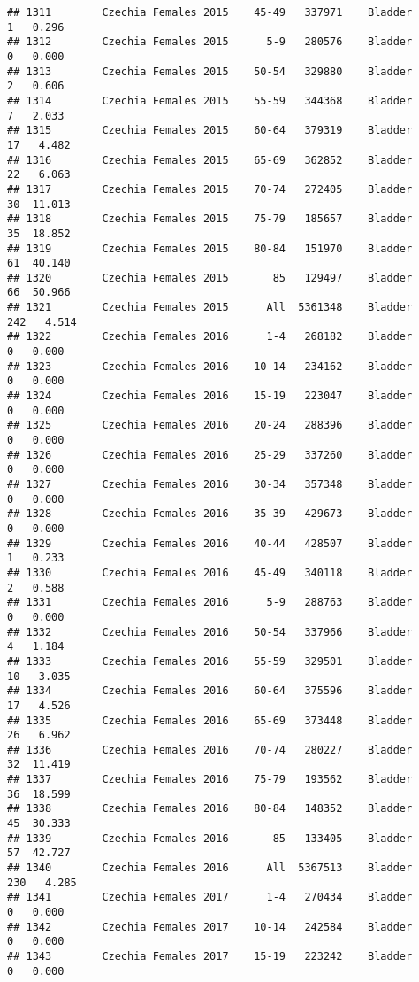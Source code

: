 \documentclass[
]{article}
\begin{document}
\begin{verbatim}
## 1311        Czechia Females 2015    45-49   337971    Bladder      1   0.296
## 1312        Czechia Females 2015      5-9   280576    Bladder      0   0.000
## 1313        Czechia Females 2015    50-54   329880    Bladder      2   0.606
## 1314        Czechia Females 2015    55-59   344368    Bladder      7   2.033
## 1315        Czechia Females 2015    60-64   379319    Bladder     17   4.482
## 1316        Czechia Females 2015    65-69   362852    Bladder     22   6.063
## 1317        Czechia Females 2015    70-74   272405    Bladder     30  11.013
## 1318        Czechia Females 2015    75-79   185657    Bladder     35  18.852
## 1319        Czechia Females 2015    80-84   151970    Bladder     61  40.140
## 1320        Czechia Females 2015       85   129497    Bladder     66  50.966
## 1321        Czechia Females 2015      All  5361348    Bladder    242   4.514
## 1322        Czechia Females 2016      1-4   268182    Bladder      0   0.000
## 1323        Czechia Females 2016    10-14   234162    Bladder      0   0.000
## 1324        Czechia Females 2016    15-19   223047    Bladder      0   0.000
## 1325        Czechia Females 2016    20-24   288396    Bladder      0   0.000
## 1326        Czechia Females 2016    25-29   337260    Bladder      0   0.000
## 1327        Czechia Females 2016    30-34   357348    Bladder      0   0.000
## 1328        Czechia Females 2016    35-39   429673    Bladder      0   0.000
## 1329        Czechia Females 2016    40-44   428507    Bladder      1   0.233
## 1330        Czechia Females 2016    45-49   340118    Bladder      2   0.588
## 1331        Czechia Females 2016      5-9   288763    Bladder      0   0.000
## 1332        Czechia Females 2016    50-54   337966    Bladder      4   1.184
## 1333        Czechia Females 2016    55-59   329501    Bladder     10   3.035
## 1334        Czechia Females 2016    60-64   375596    Bladder     17   4.526
## 1335        Czechia Females 2016    65-69   373448    Bladder     26   6.962
## 1336        Czechia Females 2016    70-74   280227    Bladder     32  11.419
## 1337        Czechia Females 2016    75-79   193562    Bladder     36  18.599
## 1338        Czechia Females 2016    80-84   148352    Bladder     45  30.333
## 1339        Czechia Females 2016       85   133405    Bladder     57  42.727
## 1340        Czechia Females 2016      All  5367513    Bladder    230   4.285
## 1341        Czechia Females 2017      1-4   270434    Bladder      0   0.000
## 1342        Czechia Females 2017    10-14   242584    Bladder      0   0.000
## 1343        Czechia Females 2017    15-19   223242    Bladder      0   0.000

\end{verbatim}
\end{document}
